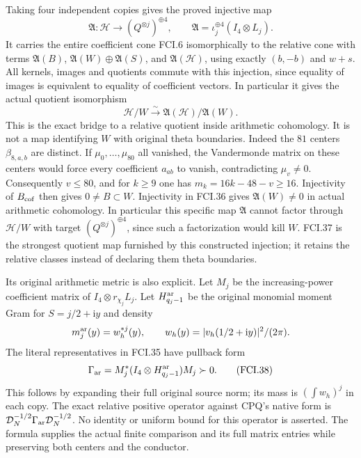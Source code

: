 Taking four independent copies gives the proved injective map
\[
 \mathfrak A:\mathcal H\longrightarrow(Q^{\otimes j})^{\oplus4},
 \qquad \mathfrak A=\iota_j^{\oplus4}(I_4\otimes L_j).
 \tag{FCI.36}
\]
It carries the entire coefficient cone FCI.6 isomorphically to the
relative cone with terms $\mathfrak A(B)$,
$\mathfrak A(W)\oplus\mathfrak A(S)$, and $\mathfrak A(\mathcal H)$,
using exactly $(b,-b)$ and $w+s$.  All kernels, images and quotients
commute with this injection, since equality of images is equivalent
to equality of coefficient vectors.  In particular it gives the
actual quotient isomorphism
\[
 \mathcal H/W\xrightarrow{\sim}
       \mathfrak A(\mathcal H)/\mathfrak A(W).
 \tag{FCI.37}
\]
This is the exact bridge to a relative quotient inside arithmetic
cohomology.  It is not a map identifying $W$ with original theta
boundaries.  Indeed the $81$ centers $\beta_{8,a,b}$ are distinct.
If $\mu_0,\ldots,\mu_{80}$ all vanished, the Vandermonde matrix
on these centers would force every coefficient $a_{ab}$ to vanish,
contradicting $\mu_v\ne0$.  Consequently $v\leq80$, and for $k\geq9$
one has $m_k=16k-48-v\geq16$.  Injectivity of $B_{\rm cof}$ then gives
$0\ne B\subset W$.  Injectivity in FCI.36 gives
$\mathfrak A(W)\ne0$ in actual arithmetic cohomology.
In particular this specific map $\mathfrak A$ cannot factor through
$\mathcal H/W$ with target $(Q^{\otimes j})^{\oplus4}$, since
such a factorization would kill $W$.  FCI.37 is the strongest
quotient map furnished by this constructed injection; it retains
the relative classes instead of declaring them theta boundaries.

Its original arithmetic metric is also explicit.  Let $M_j$ be the
increasing-power coefficient matrix of $I_4\otimes r_{\chi_j}L_j$.
Let $H_{q_j-1}^{\rm ar}$ be the original monomial moment Gram for
$S=j/2+\mathrm iy$ and density
\[
 m_j^{\rm ar}(y)=w_h^{*j}(y),\qquad
 w_h(y)=|v_h(1/2+\mathrm iy)|^2/(2\pi).
\]
The literal representatives in FCI.35 have pullback form
\[
 \Gamma_{\rm ar}=M_j^*(I_4\otimes H_{q_j-1}^{\rm ar})M_j\succ0.
 \tag{FCI.38}
\]
This follows by expanding their full original source norm; its mass
is $(\int w_h)^j$ in each copy.  The exact relative positive operator
against CPQ's native form is
$\mathcal D_N^{-1/2}\Gamma_{\rm ar}\mathcal D_N^{-1/2}$.
No identity or uniform bound for this operator is asserted.
The formula supplies the actual finite comparison and its full
matrix entries while preserving both centers and the conductor.

